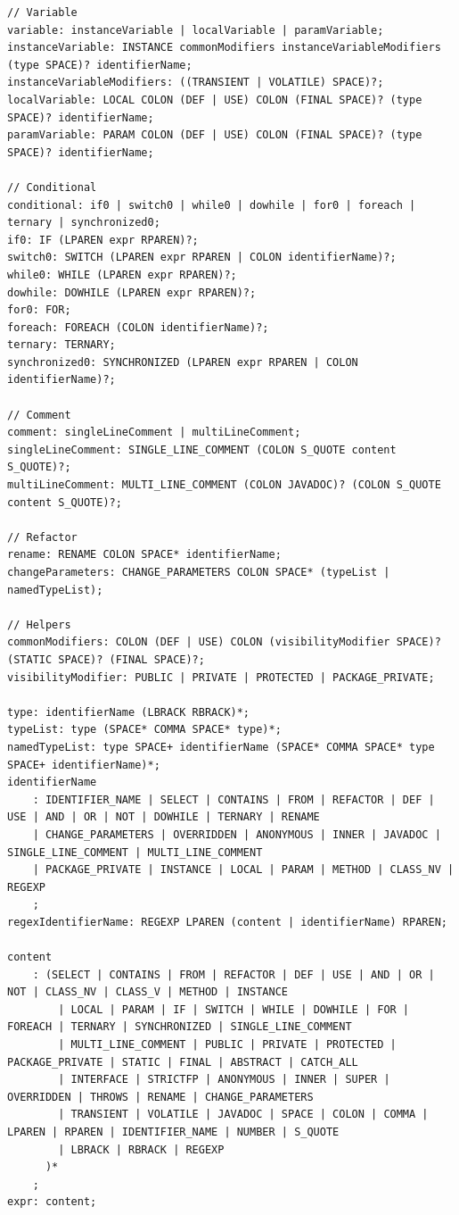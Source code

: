 \documentclass[12pt, letterpaper]{article}
\begin{document}
\begin{lstlisting}
// Variable
variable: instanceVariable | localVariable | paramVariable;
instanceVariable: INSTANCE commonModifiers instanceVariableModifiers (type SPACE)? identifierName;
instanceVariableModifiers: ((TRANSIENT | VOLATILE) SPACE)?;
localVariable: LOCAL COLON (DEF | USE) COLON (FINAL SPACE)? (type SPACE)? identifierName;
paramVariable: PARAM COLON (DEF | USE) COLON (FINAL SPACE)? (type SPACE)? identifierName;

// Conditional
conditional: if0 | switch0 | while0 | dowhile | for0 | foreach | ternary | synchronized0;
if0: IF (LPAREN expr RPAREN)?;
switch0: SWITCH (LPAREN expr RPAREN | COLON identifierName)?;
while0: WHILE (LPAREN expr RPAREN)?;
dowhile: DOWHILE (LPAREN expr RPAREN)?;
for0: FOR;
foreach: FOREACH (COLON identifierName)?;
ternary: TERNARY;
synchronized0: SYNCHRONIZED (LPAREN expr RPAREN | COLON identifierName)?;

// Comment
comment: singleLineComment | multiLineComment;
singleLineComment: SINGLE_LINE_COMMENT (COLON S_QUOTE content S_QUOTE)?;
multiLineComment: MULTI_LINE_COMMENT (COLON JAVADOC)? (COLON S_QUOTE content S_QUOTE)?;

// Refactor
rename: RENAME COLON SPACE* identifierName;
changeParameters: CHANGE_PARAMETERS COLON SPACE* (typeList | namedTypeList);

// Helpers
commonModifiers: COLON (DEF | USE) COLON (visibilityModifier SPACE)? (STATIC SPACE)? (FINAL SPACE)?;
visibilityModifier: PUBLIC | PRIVATE | PROTECTED | PACKAGE_PRIVATE;

type: identifierName (LBRACK RBRACK)*;
typeList: type (SPACE* COMMA SPACE* type)*;
namedTypeList: type SPACE+ identifierName (SPACE* COMMA SPACE* type SPACE+ identifierName)*;
identifierName
    : IDENTIFIER_NAME | SELECT | CONTAINS | FROM | REFACTOR | DEF | USE | AND | OR | NOT | DOWHILE | TERNARY | RENAME
    | CHANGE_PARAMETERS | OVERRIDDEN | ANONYMOUS | INNER | JAVADOC | SINGLE_LINE_COMMENT | MULTI_LINE_COMMENT
    | PACKAGE_PRIVATE | INSTANCE | LOCAL | PARAM | METHOD | CLASS_NV | REGEXP
    ;
regexIdentifierName: REGEXP LPAREN (content | identifierName) RPAREN;

content
    : (SELECT | CONTAINS | FROM | REFACTOR | DEF | USE | AND | OR | NOT | CLASS_NV | CLASS_V | METHOD | INSTANCE
        | LOCAL | PARAM | IF | SWITCH | WHILE | DOWHILE | FOR | FOREACH | TERNARY | SYNCHRONIZED | SINGLE_LINE_COMMENT
        | MULTI_LINE_COMMENT | PUBLIC | PRIVATE | PROTECTED | PACKAGE_PRIVATE | STATIC | FINAL | ABSTRACT | CATCH_ALL
        | INTERFACE | STRICTFP | ANONYMOUS | INNER | SUPER | OVERRIDDEN | THROWS | RENAME | CHANGE_PARAMETERS
        | TRANSIENT | VOLATILE | JAVADOC | SPACE | COLON | COMMA | LPAREN | RPAREN | IDENTIFIER_NAME | NUMBER | S_QUOTE
        | LBRACK | RBRACK | REGEXP
      )*
    ;
expr: content;
\end{lstlisting}
\end{document}

